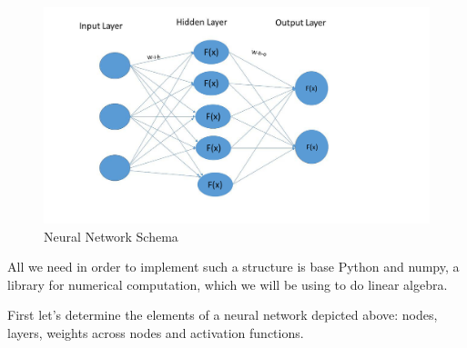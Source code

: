 \begin{figure}[H]
    \includegraphics[width=\linewidth]{pics/neural_network1.jpg}
    \caption{\label{fig:nn-schema} Neural Network Schema}
\end{figure}

All we need in order to implement such a structure is base Python and numpy, a library for numerical computation, which we will be using to do linear algebra. 

First let's determine the elements of a neural network depicted above: nodes, layers, weights across nodes and activation functions.


